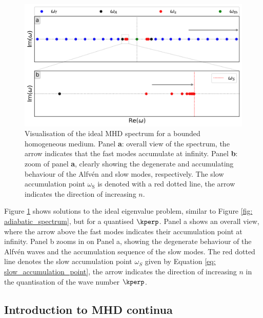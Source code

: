 \begin{figure}[t]
  \centering
  \includegraphics[width=\textwidth]{bounded_ideal_spectrum.png}
  \caption{
    Visualisation of the ideal MHD spectrum for a bounded homogeneous medium. Panel \textbf{a}: overall view of the spectrum, the arrow indicates that the fast modes accumulate at infinity.
    Panel \textbf{b}: zoom of panel \textbf{a}, clearly showing the degenerate and accumulating behaviour of the Alfv\'en and slow modes, respectively. The slow accumulation point $\omega_\text{S}$ is denoted with a red dotted line, the arrow indicates the direction of increasing $n$.
  }
  \label{fig: bounded_spectrum}
\end{figure}

Figure \ref{fig: bounded_spectrum} shows solutions to the ideal eigenvalue problem, similar to Figure \ref{fig: adiabatic_spectrum}, but for a quantised $\kperp$. Panel a shows an overall view, where the arrow above the fast modes indicates their accumulation point at infinity. Panel b zooms in on Panel a, showing the degenerate behaviour of the Alfv\'en waves and the accumulation sequence of the slow modes. The red dotted line denotes the slow accumulation point $\omega_S$ given by Equation \eqref{eq: slow_accumulation_point}, the arrow indicates the direction of increasing $n$ in the quantisation of the wave number $\kperp$.

\subsection{Introduction to MHD continua} \label{ss: mhd_continua}
